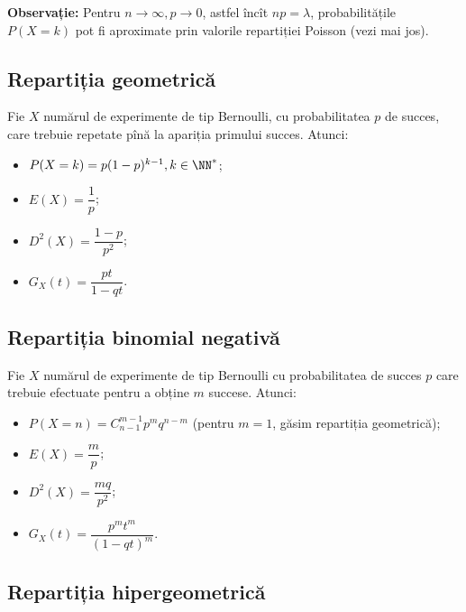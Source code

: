 \textbf{Observație:} Pentru $ n \to \infty, p \to 0 $, astfel încît $ np = \lambda $,
probabilitățile $ P(X = k) $ pot fi aproximate prin valorile repartiției Poisson
(vezi mai jos).


\subsection{Repartiția geometrică}

\indent\indent Fie $ X $ numărul de experimente de tip Bernoulli, cu probabilitatea $ p $
de succes, care trebuie repetate pînă la apariția primului succes. Atunci:
\begin{itemize}
\item $ P(X = k) = p(1 - p)^{k - 1}, k \in \NN^\ast $;
\item $ E(X) = \dfrac{1}{p} $;
\item $ D^2(X) = \dfrac{1 - p}{p^2} $;
\item $ G_X(t) = \dfrac{pt}{1 - qt} $.
\end{itemize}


\subsection{Repartiția binomial negativă}

\indent\indent Fie $ X $ numărul de experimente de tip Bernoulli cu probabilitatea
de succes $ p $ care trebuie efectuate pentru a obține $ m $ succese. Atunci:
\begin{itemize}
\item $ P(X = n) = C_{n-1}^{m - 1} p^m q^{n-m} $ (pentru $ m = 1 $, găsim repartiția
  geometrică);
\item $ E(X) = \dfrac{m}{p} $;
\item $ D^2(X) = \dfrac{mq}{p^2} $;
\item $ G_X(t) = \dfrac{p^m t^m}{(1 - qt)^m} $.
\end{itemize}


\subsection{Repartiția hipergeometrică}

